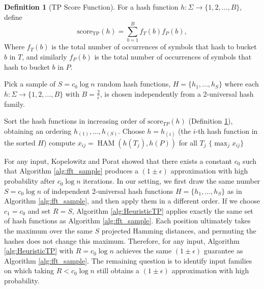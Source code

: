 \documentclass{article}
\theoremstyle{definition}
\newtheorem{definition}{Definition}[section]
\newcommand{\op}{\operatorname}
\newcommand{\score}{\text{score}}
\begin{document}
\begin{definition}[TP Score Function] \label{def:scoreTP}
    For a hash function $h: \Sigma\to\{1, 2, \dots, B\}$, define
    \[
    \text{score}_\text{TP}(h)=\sum_{b=1}^{B} f_T(b) f_P(b),
    \]
    Where $f_T(b)$ is the total number of occurrences of symbols that hash to bucket $b$ in $T$, and similarly $f_P(b)$ is the total number of occurrences of symbols that hash to bucket $b$ in $P$.
    
\end{definition}

\begin{algorithm}
\caption{ApproxHAM Heuristic TP}
\label{alg:HeuristicTP}

\begin{algorithmic}
\State Pick a sample of $S=c_0\log n$ random hash functions, $H=\{ h_1, ..., h_S \}$ where each $h : \Sigma \rightarrow  \{1, 2, \dots, B\}$ with $B=\frac{2}{\epsilon}$, is chosen independently from a 2-universal hash family.

\State Sort the hash functions in increasing order of $\score_{TP}(h)$ (Definition \ref{def:scoreTP}), obtaining an ordering $h_{(1)}, \dots, h_{(S)}$.
    \State Choose $h=h_{(i)}$ (the $i$-th hash function in the sorted $H$)
    \State compute $x_{ij} = \op{HAM}(h(T_j), h(P))$ for all $T_j$
\EndFor
\State \Return $ \{\max_j x_{ij}\}$
\end{algorithmic}
\end{algorithm}

For any input, Kopelowitz and Porat showed that there exists a constant $c_0$ such that Algorithm \ref{alg:fft_sample} produces a $(1\pm \epsilon)$ approximation with high probability after $c_0 \log n$ iterations.
In our setting, we first draw the same number $S = c_0 \log n$ of independent 2-universal hash functions $H = \{h_1,\dots,h_S\}$ as in Algorithm \ref{alg:fft_sample}, and then apply them in a different order.
If we choose $c_1 = c_0$ and set $R = S$, Algorithm \ref{alg:HeuristicTP} applies exactly the same set of hash functions as Algorithm \ref{alg:fft_sample}.
Each position ultimately takes the maximum over the same $S$ projected Hamming distances, and permuting the hashes does not change this maximum.
Therefore, for any input, Algorithm \ref{alg:HeuristicTP} with $R = c_0 \log n$ achieves the same $(1\pm \epsilon)$ guarantee as Algorithm \ref{alg:fft_sample}.
The remaining question is to identify input families on which taking $R < c_0 \log n$ still obtains a $(1\pm \epsilon)$ approximation with high probability.
\end{document}
